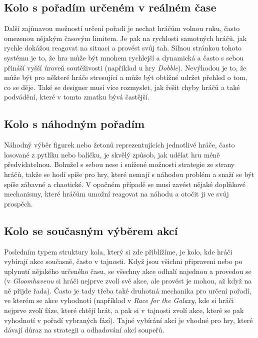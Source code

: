 \subsection{Kolo s pořadím určeném v reálném čase}
\label{subsec:realtime_order}

Další zajímavou možností určení pořadí je nechat hráčům volnou ruku, často omezenou nějakým časovým limitem. Je pak na rychlosti samotných hráčů, jak rychle dokážou reagovat na situaci a provést svůj tah. Silnou stránkou tohoto systému je to, že hra může být mnohem rychlejší a dynamická a často s sebou přináší vyšší úroveň soutěživosti (například u hry \textit{Dobble}). Nevýhodou je to, že může být pro některé hráče stresující a může být obtížné udržet přehled o tom, co se děje. Také se designer musí více rozmyslet, jak řešit chyby hráčů a také podvádění, které v tomto zmatku bývá častější.

\subsection{Kolo s náhodným pořadím}
\label{subsec:random_order}

Náhodný výběr figurek nebo žetonů reprezentujících jednotlivé hráče, často losované z pytlíku nebo balíčku, je skvělý způsob, jak udělat hru méně předvídatelnou. Bohužel s sebou nese i snížené možnosti strategie ze strany hráčů, takže se hodí spíše pro hry, které nemají s náhodou problém a snaží se být spíše zábavné a chaotické. V opačném případě se musí zavést nějaké doplňkové mechanismy, které hráčům umožní reagovat na náhodu a otočit ji ve svůj prospěch.

\subsection{Kolo se současným výběrem akcí}
\label{subsec:action_selection_order}

Posledním typem struktury kola, který si zde přiblížíme, je kolo, kde hráči vybírají akce současně, často v tajnosti. Když jsou všichni připraveni nebo po uplynutí nějakého určeného času, se všechny akce odhalí najednou a provedou se (v \textit{Gloomhavenu} si hráči nejprve zvolí své akce, ale provést je mohou, až když na ně přijde řada). Často je tady třeba také druhotná mechanika pro určení pořadí, ve kterém se akce vyhodnotí (například v \textit{Race for the Galaxy}, kde si hráči nejprve zvolí fáze, které chtějí hrát, a pak si v tajnosti zvolí akce, které se pak vyhodnotí v pořadí vybraných fází). Tajné vybírání akcí je vhodné pro hry, které dávají důraz na strategii a odhadování akcí soupeřů.


